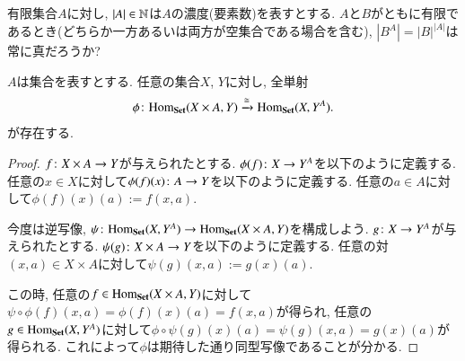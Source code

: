 \begin{exercise}
有限集合$A$に対し, $|A|\in{\mathbb N}$は$A$の濃度(要素数)を表すとする. $A$と$B$がともに有限であるとき(どちらか一方あるいは両方が空集合である場合を含む), $|B^A|=|B|^{|A|}$は常に真だろうか?
\end{exercise}

\begin{proposition}[Currying]\label{prop:curry}


$A$は集合を表すとする. 任意の集合$X$, $Y$に対し, 全単射
\begin{align}\label{dia:curry bijection}
\phi\taking\Hom_\Set(X\times A,Y)\To{\iso}\Hom_\Set(X,Y^A).
\end{align}
が存在する.

\end{proposition}

\begin{proof}


$f\colon X\times A\rightarrow Y$が与えられたとする. $\phi(f)\colon X\rightarrow Y^A$を以下のように定義する. 任意の$x\in X$に対して$\phi(f)(x)\colon A\rightarrow Y$を以下のように定義する. 任意の$a\in A$に対して$\phi(f)(x)(a):=f(x,a)$.


今度は逆写像, $\psi\taking\Hom_\Set(X,Y^A)\to\Hom_\Set(X\times A,Y)$を構成しよう. $g\colon X\rightarrow Y^A$が与えられたとする. $\psi(g)\colon X\times A\rightarrow Y$を以下のように定義する. 任意の対$(x,a)\in X\times A$に対して$\psi(g)(x,a):=g(x)(a)$.


この時, 任意の$f\in\Hom_\Set(X\times A,Y)$に対して$\psi\circ\phi(f)(x,a)=\phi(f)(x)(a)=f(x,a)$が得られ, 任意の$g\in\Hom_\Set(X,Y^A)$に対して$\phi\circ\psi(g)(x)(a)=\psi(g)(x,a)=g(x)(a)$が得られる. これによって$\phi$は期待した通り同型写像であることが分かる.

\end{proof}


